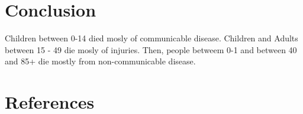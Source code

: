 \documentclass[
]{article}
\begin{document}
\hypertarget{conclusion}{%
\section{Conclusion}\label{conclusion}}

Children between 0-14 died mosly of communicable disease. Children and
Adults between 15 - 49 die mosly of injuries. Then, people betweem 0-1
and between 40 and 85+ die mostly from non-communicable disease.

\hypertarget{references}{%
\section{References}\label{references}}
\end{document}
